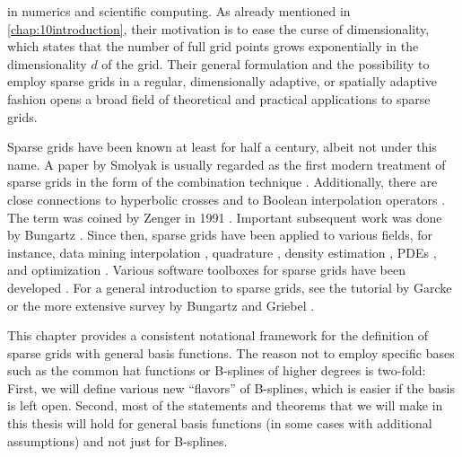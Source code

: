 
\label{chap:20sparseGrids}

in numerics and scientific computing.
As already mentioned in \cref{chap:10introduction},
their motivation is to ease the curse of dimensionality,
which states that the number of full grid points
grows exponentially in the dimensionality $d$ of the grid.
Their general formulation and the possibility to employ sparse grids in a
regular, dimensionally adaptive, or spatially adaptive fashion
opens a broad field of theoretical and practical applications
to sparse grids.

Sparse grids have been known at least for half a century,
albeit not under this name.
A paper by Smolyak \cite{Smolyak63Quadrature} is usually regarded
as the first modern treatment of sparse grids in the form
of the combination technique \cite{Garcke13Sparse}.
Additionally, there are close connections to
hyperbolic crosses \cite{Temljakov82Approximation}
and to Boolean interpolation operators
.
The term  was coined by Zenger in 1991
\cite{Zenger91Sparse}.
Important subsequent work was done by Bungartz
.
Since then, sparse grids have been applied to various fields,
for instance,
data mining
interpolation
\cite{Sickel11Spline},
quadrature
\cite{Gerstner98Numerical},
density estimation
,
PDEs
, and
optimization
.
Various software toolboxes for sparse grids have been developed
.
For a general introduction to sparse grids,
see the tutorial by Garcke \cite{Garcke13Sparse} or
the more extensive survey by Bungartz and Griebel
\cite{Bungartz04Sparse}.

This chapter provides a consistent notational framework
for the definition of sparse grids with general basis functions.
The reason not to employ specific bases such as the common hat functions
or B-splines of higher degrees is two-fold:
First, we will define various new ``flavors'' of B-splines,
which is easier if the basis is left open.
Second, most of the statements and theorems that we will make in this
thesis will hold for general basis functions
(in some cases with additional assumptions)
and not just for B-splines.

